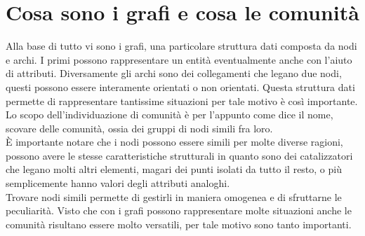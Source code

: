 \section{Cosa sono i grafi e cosa le comunità}
Alla base di tutto vi sono i grafi, una particolare struttura dati composta da nodi e archi. I primi possono rappresentare un entità eventualmente anche con l'aiuto di attributi. Diversamente gli archi sono dei collegamenti che legano due nodi, questi possono essere interamente orientati o non orientati. Questa struttura dati permette di rappresentare tantissime situazioni per tale motivo è così importante.\\
Lo scopo dell'individuazione di comunità è per l'appunto come dice il nome, scovare delle comunità, ossia dei gruppi di nodi simili fra loro.\\
È importante notare che i nodi possono essere simili per molte diverse ragioni, possono avere le stesse caratteristiche strutturali in quanto sono dei catalizzatori che legano molti altri elementi, magari dei punti isolati da tutto il resto, o più semplicemente hanno valori degli attributi analoghi.\\
Trovare nodi simili permette di gestirli in maniera omogenea e di sfruttarne le peculiarità. Visto che con i grafi possono rappresentare molte situazioni anche le comunità risultano essere molto versatili, per tale motivo sono tanto importanti.
%

